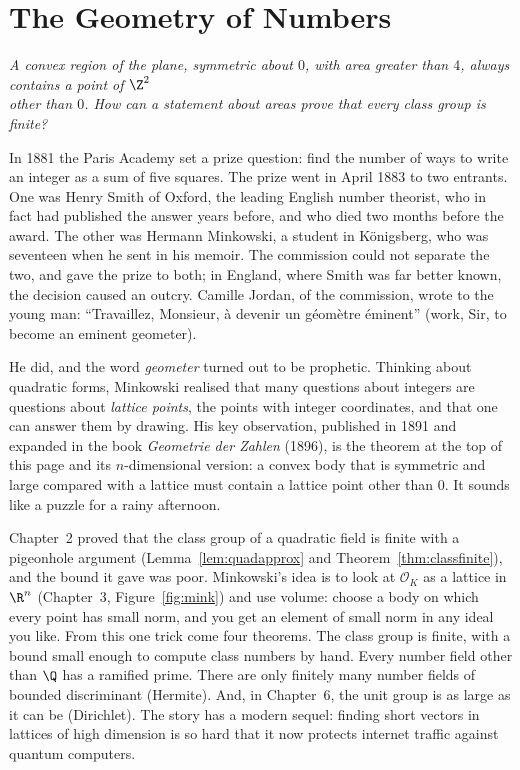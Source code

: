 \chapter{The Geometry of Numbers}
\begin{center}\itshape
A convex region of the plane, symmetric about $0$, with area greater than $4$, always contains a point of $\Z^2$\\
other than $0$. How can a statement about areas prove that every class group is finite?
\end{center}

In 1881 the Paris Academy set a prize question: find the number of ways to write an integer as a sum of five squares.
The prize went in April 1883 to two entrants. One was Henry Smith of Oxford, the leading English number theorist, who in fact
had published the answer years before, and who died two months before the award. The other was Hermann Minkowski, a
student in K\"onigsberg, who was seventeen when he sent in his memoir. The commission could not separate the two, and
gave the prize to both; in England, where Smith was far better known, the decision caused an outcry. Camille Jordan, of
the commission, wrote to the young man: ``Travaillez, Monsieur, \`a devenir un g\'eom\`etre \'eminent'' (work, Sir, to
become an eminent geometer).


He did, and the word \emph{geometer} turned out to be prophetic. Thinking about quadratic forms, Minkowski realised that
many questions about integers are questions about \emph{lattice points}, the points with integer coordinates, and that one
can answer them by drawing. His key observation, published in 1891 and expanded in the book \emph{Geometrie der Zahlen}
(1896), is the theorem at the top of this page and its $n$-dimensional version: a convex body that is symmetric and large
compared with a lattice must contain a lattice point other than $0$. It sounds like a puzzle for a rainy afternoon.

Chapter~2 proved that the class group of a quadratic field is finite with a pigeonhole argument (Lemma~\ref{lem:quadapprox} and
Theorem~\ref{thm:classfinite}), and the bound it gave was poor. Minkowski's idea is to look at $\mathcal O_K$ as a lattice in $\R^n$
(Chapter~3, Figure~\ref{fig:mink}) and use volume: choose a body on which every point has small norm, and you get an
element of small norm in any ideal you like. From this one trick come four theorems. The class group is finite, with a
bound small enough to compute class numbers by hand. Every number field other than $\Q$ has a ramified prime. There are only
finitely many number fields of bounded discriminant (Hermite). And, in Chapter~6, the unit group is as large as it can be
(Dirichlet). The story has a modern sequel: finding short vectors in lattices of high dimension is so hard that it now
protects internet traffic against quantum computers.

